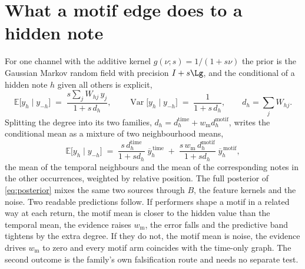 \section{What a motif edge does to a hidden note}\label{sec:motif-conditional}
For one channel with the additive kernel $g(\nu; s) = 1/(1 + s\nu)$ the
prior is the Gaussian Markov random field with precision $I + s \Lg$, and
the conditional of a hidden note $h$ given all others is explicit,
\begin{equation}
  \mathbb E\bigl[y_h \mid y_{-h}\bigr] \;=\; \frac{s \sum_{j} W_{hj}\, y_j}{1 + s\, d_h},
  \qquad
  \operatorname{Var}\bigl[y_h \mid y_{-h}\bigr] \;=\; \frac{1}{1 + s\, d_h},
  \qquad d_h = \sum_j W_{hj} .
  \label{eq:motif-cond}
\end{equation}
Splitting the degree into its two families,
$d_h = d_h^{\mathrm{time}} + w_{\mathrm m} d_h^{\mathrm{motif}}$, writes the
conditional mean as a mixture of two neighbourhood means,
\begin{equation}
  \mathbb E\bigl[y_h \mid y_{-h}\bigr] \;=\;
  \frac{s\, d_h^{\mathrm{time}}}{1 + s d_h}\;\overline{y}^{\,\mathrm{time}}_h
  \;+\; \frac{s\, w_{\mathrm m}\, d_h^{\mathrm{motif}}}{1 + s d_h}\;\overline{y}^{\,\mathrm{motif}}_h ,
  \label{eq:motif-mix}
\end{equation}
the mean of the temporal neighbours and the mean of the corresponding notes
in the other occurrences, weighted by relative position. The full posterior
of \eqref{eq:posterior} mixes the same two sources through $B$, the feature
kernels and the noise. Two readable predictions follow. If performers shape
a motif in a related way at each return, the motif mean is closer to the
hidden value than the temporal mean, the evidence raises $w_{\mathrm m}$,
the error falls and the predictive band tightens by the extra degree. If
they do not, the motif mean is noise, the evidence drives $w_{\mathrm m}$ to
zero and every motif arm coincides with the time-only graph. The second
outcome is the family's own falsification route and needs no separate
test.

